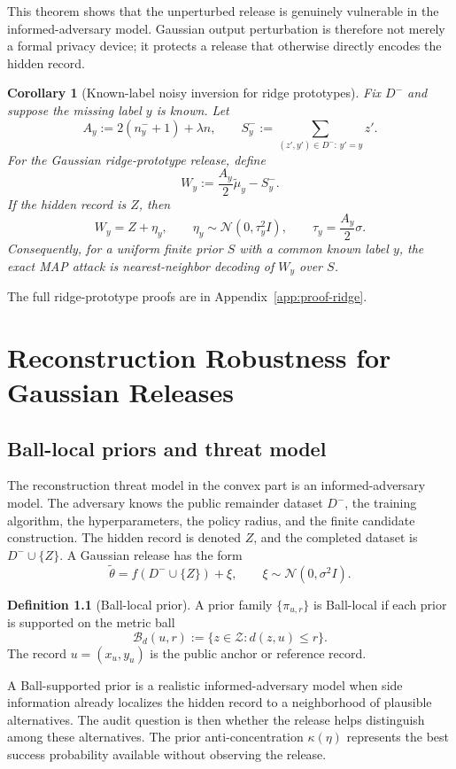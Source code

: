 \documentclass[11pt,a4paper]{report}
\theoremstyle{plain}
\newtheorem{corollary}[theorem]{Corollary}
\theoremstyle{definition}
\newtheorem{definition}[theorem]{Definition}
\theoremstyle{remark}
\newcommand{\N}{\mathcal{N}}
\newcommand{\Ball}{\mathcal{B}}
\newcommand{\cZ}{\mathcal{Z}}
\begin{document}
This theorem shows that the unperturbed release is genuinely vulnerable in the informed-adversary model.  Gaussian output perturbation is therefore not merely a formal privacy device; it protects a release that otherwise directly encodes the hidden record.

\begin{corollary}[Known-label noisy inversion for ridge prototypes]
\label{cor:ridge-noisy-inversion}
Fix $D^-$ and suppose the missing label $y$ is known.  Let
\[
A_y:=2(n_y^-+1)+\lambda n,
\qquad
S_y^-:=\sum_{(z',y')\in D^-:\,y'=y}z'.
\]
For the Gaussian ridge-prototype release, define
\[
W_y:=\frac{A_y}{2}\widetilde\mu_y-S_y^-.
\]
If the hidden record is $Z$, then
\[
W_y=Z+\eta_y,
\qquad
\eta_y\sim\N(0,\tau_y^2I),
\qquad
\tau_y=\frac{A_y}{2}\sigma.
\]
Consequently, for a uniform finite prior $S$ with a common known label $y$, the exact MAP attack is nearest-neighbor decoding of $W_y$ over $S$.
\end{corollary}

The full ridge-prototype proofs are in Appendix~\ref{app:proof-ridge}.

\chapter{Reconstruction Robustness for Gaussian Releases}
\label{ch:gaussian-rero}

\section{Ball-local priors and threat model}
\label{sec:ball-local-priors}

The reconstruction threat model in the convex part is an informed-adversary model.  The adversary knows the public remainder dataset $D^-$, the training algorithm, the hyperparameters, the policy radius, and the finite candidate construction.  The hidden record is denoted $Z$, and the completed dataset is $D^-\cup\{Z\}$.  A Gaussian release has the form
\[
\widetilde\theta=f(D^-\cup\{Z\})+\xi,
\qquad
\xi\sim\N(0,\sigma^2I).
\]

\begin{definition}[Ball-local prior]
A prior family $\{\pi_{u,r}\}$ is Ball-local if each prior is supported on the metric ball
\[
\Ball_d(u,r):=\{z\in\cZ:d(z,u)\le r\}.
\]
The record $u=(x_u,y_u)$ is the public anchor or reference record.
\end{definition}

A Ball-supported prior is a realistic informed-adversary model when side information already localizes the hidden record to a neighborhood of plausible alternatives.  The audit question is then whether the release helps distinguish among these alternatives.  The prior anti-concentration $\kappa(\eta)$ represents the best success probability available without observing the release.
\end{document}
